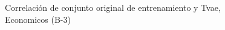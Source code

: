 \begin{figure}[H]
    \centering
    
    \caption{Correlación de conjunto original de entrenamiento y Tvae, Economicos (B-3)}
    \label{pairwise-economicos-b-3-tvae}
\end{figure}